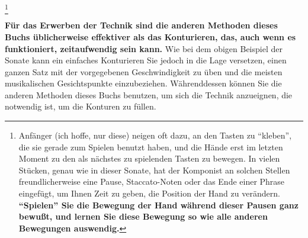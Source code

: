 \label{pausen}\footnote{Anfänger (ich hoffe, nur diese) neigen oft dazu, an den Tasten zu \enquote{kleben}, die sie gerade zum Spielen benutzt haben, und die Hände erst im letzten Moment zu den als nächstes zu spielenden Tasten zu bewegen.
In vielen Stücken, genau wie in dieser Sonate, hat der Komponist an solchen Stellen freundlicherweise eine Pause, Staccato-Noten oder das Ende einer 
Phrase eingefügt, um Ihnen Zeit zu geben, die Position der Hand zu verändern.
\textbf{\enquote{Spielen} Sie die Bewegung der Hand während dieser Pausen ganz bewußt, und lernen Sie diese Bewegung so wie alle anderen Bewegungen auswendig.}}

\textbf{Für das Erwerben der Technik sind die anderen Methoden dieses Buchs üblicherweise effektiver als das Konturieren, das, auch wenn es funktioniert, zeitaufwendig sein kann.}
Wie bei dem obigen Beispiel der Sonate kann ein einfaches Konturieren Sie jedoch in die Lage versetzen, einen ganzen Satz mit der vorgegebenen Geschwindigkeit zu üben und die meisten musikalischen Gesichtspunkte einzubeziehen.
Währenddessen können Sie die anderen Methoden dieses Buchs benutzen, um sich die Technik anzueignen, die notwendig ist, um die Konturen zu füllen.



